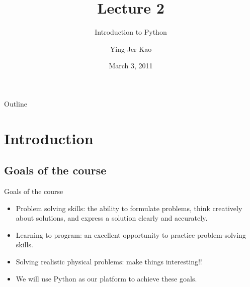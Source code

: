 \documentclass{beamer}
\title[Introduction to Python] %
{Lecture 2}
\subtitle
{Introduction to Python} %
\author[Ying-Jer Kao] %
{Ying-Jer Kao}
\institute[National Taiwan University] %
{
  Department of Physics\\
 National Taiwan University
  }
\date[Numerical Analysis and Programming] %
{March 3, 2011}
\begin{document}
\begin{frame}
  \titlepage
\end{frame}

\begin{frame}{Outline}
  \tableofcontents
\end{frame}




\section{Introduction}
\subsection[Goals of the course]{Goals of the course}

\begin{frame}{Goals of the course}{}

  \begin{itemize}[<+->]
  \item
   \alert{ Problem solving skills}: the ability to formulate
problems, think creatively about solutions, and express a solution clearly
and accurately. 
      \item \alert{Learning  to program}:  an 
excellent opportunity to practice problem-solving skills.
\item \alert{Solving realistic physical problems}: make things interesting!!
\item We will use Python as our platform to achieve these goals. 
  \end{itemize}
\end{frame}
\end{document}
